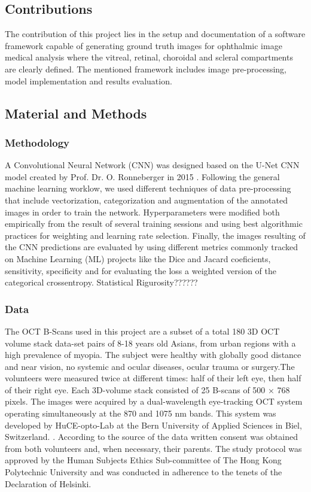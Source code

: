 \documentclass[12pt,a4paper]{scrartcl}
\begin{document}
\subsection{Contributions}

The contribution of this project lies in the setup and documentation of a software framework capable of generating ground truth images for ophthalmic image medical analysis where the vitreal, retinal, choroidal and scleral compartments are clearly defined. The mentioned framework includes image pre-processing, model implementation and results evaluation. 

\subsection{Material and Methods}

\subsubsection{Methodology}

A Convolutional Neural Network (CNN) was designed based on the U-Net CNN model created by Prof. Dr. O. Ronneberger in 2015 \cite{Ronneberger2015}. Following the general machine learning worklow, we used different techniques of data pre-processing that include vectorization, categorization and augmentation of the annotated images in order to train the network. Hyperparameters were modified both empirically from the result of several training sessions and using best algorithmic practices for weighting and learning rate selection. Finally, the images resulting of the CNN predictions are evaluated by using different metrics commonly tracked on Machine Learning (ML) projects like the Dice and Jacard coeficients, sensitivity, specificity and for evaluating the loss a weighted version of the categorical crossentropy. Statistical Rigurosity??????

\subsubsection{Data}

The OCT B-Scans used in this project are a subset of a total 180 3D OCT volume stack data-set pairs of 8-18 years old Asians, from urban regions with a high prevalence of myopia. The subject were healthy with globally good distance and near vision, no systemic and ocular diseases, ocular trauma or surgery\cite{ronchetti2019}.The volunteers were measured twice at different times: half of their left eye, then half of their right eye. Each 3D-volume stack consisted of 25 B-scans of 500 × 768 pixels. The images were acquired by a dual-wavelength eye-tracking OCT system operating simultaneously at the 870 and 1075 nm bands. This system was developed by HuCE-opto-Lab at the Bern University of Applied Sciences in Biel, Switzerland. \cite{ronchetti2019}. According to the source of the data \cite{ronchetti2019} written consent was obtained from both volunteers and, when necessary, their parents. The study protocol was approved by the Human Subjects Ethics Sub-committee of The Hong Kong Polytechnic University and was conducted in adherence to the tenets of the Declaration of Helsinki.
\end{document}
